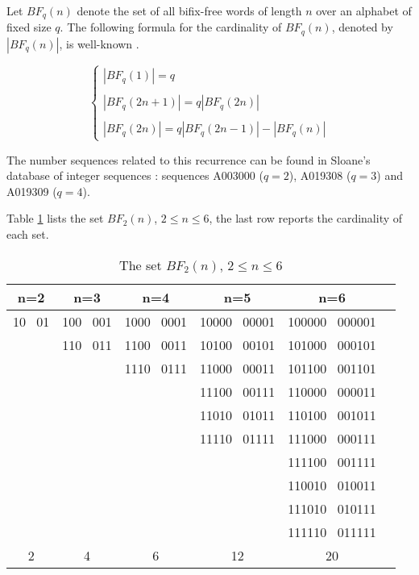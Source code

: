 \documentclass[a4paper,11pt]{article}
\begin{document}
Let $BF_q(n)$ denote the set of all bifix-free words of length $n$
over an alphabet of fixed size $q$. The following formula for the
cardinality of $BF_q(n)$, denoted by $|BF_q(n)|$, is well-known
\cite{11}.

\begin{equation}
\label{bifixfree} \left \{
\begin{array}{lll}
|BF_q(1)|=q\\\\
|BF_q(2n+1)|=q|BF_q(2n)|\\\\
|BF_q(2n)|=q|BF_q(2n-1)|-|BF_q(n)|
\end{array}
\right.
\end{equation}

The number sequences related to this recurrence can be found in
Sloane's database of integer sequences \cite{12}: sequences
A003000 ($q=2$), A019308 ($q=3$) and A019309 ($q=4$).

Table \ref{bfree} lists the set $BF_2(n)$, $2 \leq n \leq 6$, the
last row reports the cardinality of each set.

\begin{table}[htb]
\begin{center}
\begin{tabular}{|c|c|c|c|c|c|}
\hline \hline n=2 & n=3 & n=4 & n=5 & n=6\\
\hline

10 \ 01 & 100 \ 001 & 1000 \ 0001 & 10000 \ 00001 & 100000 \ 000001 \\
   & 110 \ 011 & 1100 \ 0011 & 10100 \ 00101 & 101000 \ 000101\\
   &     & 1110 \ 0111 & 11000 \ 00011 & 101100 \ 001101\\
   &     &      & 11100 \ 00111 & 110000 \ 000011\\
   &     &      & 11010 \ 01011 & 110100 \ 001011\\
   &     &      & 11110 \ 01111 & 111000 \ 000111\\
   &     &      &       & 111100 \ 001111\\
   &     &      &       & 110010 \ 010011\\
   &     &      &       & 111010 \ 010111\\
   &     &      &       & 111110 \ 011111\\
\hline
 2 & 4 & 6 & 12 & 20\\
\hline


\end{tabular}
\end{center}
\caption{\label{bfree}The set $BF_2(n)$, $2 \leq n \leq 6$}
\end{table}
\end{document}
